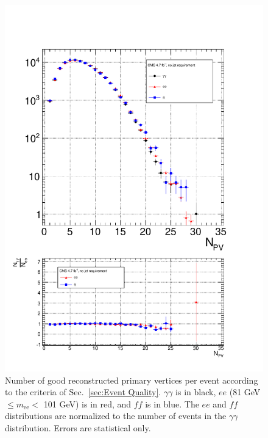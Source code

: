 \documentclass[dissertation_bw.tex]{subfiles}
\begin{document}
\begin{figure}
	\centering
	\includegraphics[scale=0.5]{hadronic_activity_nPV}
	\caption{Number of good reconstructed primary vertices per event according to the criteria of Sec.~\ref{sec:Event Quality}.  $\gamma\gamma$ is in black, $ee$ (81 GeV $\leq m_{\mathrm{ee}} <$ 101 GeV) is in red, and $\mathit{ff}$ is in blue.  The $ee$ and $\mathit{ff}$ distributions are normalized to the number of events in the $\gamma\gamma$ distribution.  Errors are statistical only.}
	\label{fig:hadronic_activity_nPV}
\end{figure}
\end{document}
